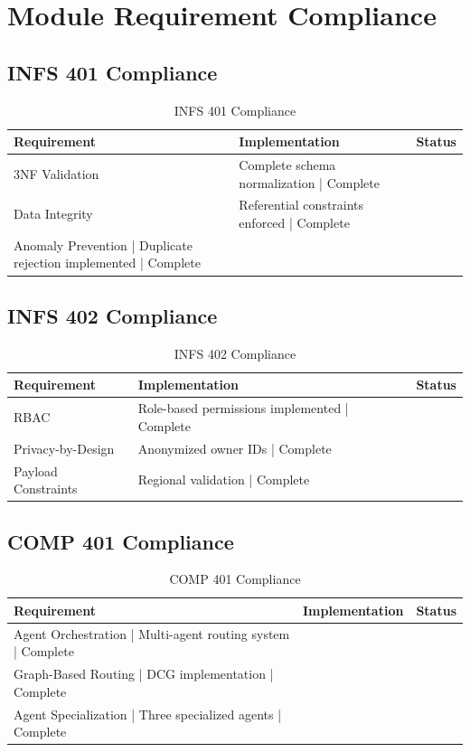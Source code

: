 \section{Module Requirement Compliance}

\subsection{INFS 401 Compliance}

\begin{table}[H]
\centering
\begin{tabular}{|l|l|l|}
\hline
\textbf{Requirement} & \textbf{Implementation} & \textbf{Status} \\
\hline
3NF Validation & Complete schema normalization | Complete \\
Data Integrity & Referential constraints enforced | Complete \\
Anomaly Prevention | Duplicate rejection implemented | Complete \\
\hline
\end{tabular}
\caption{INFS 401 Compliance}
\end{table}

\subsection{INFS 402 Compliance}

\begin{table}[H]
\centering
\begin{tabular}{|l|l|l|}
\hline
\textbf{Requirement} & \textbf{Implementation} & \textbf{Status} \\
\hline
RBAC & Role-based permissions implemented | Complete \\
Privacy-by-Design & Anonymized owner IDs | Complete \\
Payload Constraints & Regional validation | Complete \\
\hline
\end{tabular}
\caption{INFS 402 Compliance}
\end{table}

\subsection{COMP 401 Compliance}

\begin{table}[H]
\centering
\begin{tabular}{|l|l|l|}
\hline
\textbf{Requirement} & \textbf{Implementation} & \textbf{Status} \\
\hline
Agent Orchestration | Multi-agent routing system | Complete \\
Graph-Based Routing | DCG implementation | Complete \\
Agent Specialization | Three specialized agents | Complete \\
\hline
\end{tabular}
\caption{COMP 401 Compliance}
\end{table}

